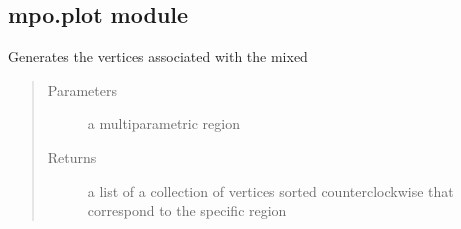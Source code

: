\documentclass[letterpaper,10pt,english]{sphinxmanual}
\begin{document}
\subsection{mpo.plot module}
\label{\detokenize{mpo:module-mpo.plot}}\label{\detokenize{mpo:mpo-plot-module}}

\begin{fulllineitems}
\label{\detokenize{mpo:mpo.plot.gen_vertices}}
\sphinxAtStartPar
Generates the vertices associated with the mixed
\begin{quote}\begin{description}
\item[{Parameters}] \leavevmode
\sphinxAtStartPar
{} \textendash{} a multiparametric region

\item[{Returns}] \leavevmode
\sphinxAtStartPar
a list of a collection of vertices sorted counterclockwise that correspond to the specific region

\end{description}\end{quote}

\end{fulllineitems}

\end{document}
